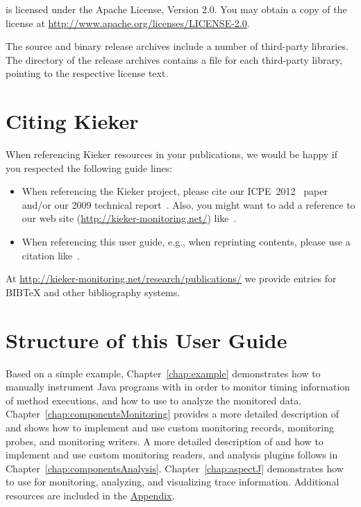 \Kieker{} is licensed under the Apache License, Version 2.0. You may obtain a copy of %
the license at \url{http://www.apache.org/licenses/LICENSE-2.0}.

The \Kieker{} source and binary release archives include a number of third-party %
libraries. %
The  directory of the release archives contains a %
 file for each third-party library, pointing to the respective license text.

\section{Citing Kieker}\label{sec:ch1:citingKieker}

When referencing Kieker resources in your publications, we would be happy if you %
respected the following guide lines:

\begin{itemize}
\item When referencing the Kieker project, please cite our %
ICPE~2012~\cite{KiekerICPE2012} paper and/or our 2009 technical report~\cite{vanHoornRohrHasselbringWallerEhlersFreyKieselhorst2009TRContinuousMonitoringOfSoftwareServicesDesignAndApplicationOfTheKiekerFramework}. %
Also, you might want to add a reference to our web site (\url{http://kieker-monitoring.net/}) %
like~\cite{KiekerWebSite}. 
\item When referencing this user guide, e.g., when reprinting contents, please %
use a citation like~\cite{Kieker1.7UserGuide}.
\end{itemize}

\noindent At \url{http://kieker-monitoring.net/research/publications/} we provide %
entries for $\mathrm{B\scriptstyle IB}\!$\TeX{} and other bibliography %
systems.

\section{Structure of this User Guide}

Based on a simple example, Chapter~\ref{chap:example} demonstrates %
how to manually instrument Java programs with \KiekerMonitoringPart{} %
in order to monitor timing information of method executions, and %
how to use \KiekerAnalysisPart{} to analyze the monitored data. %
Chapter~\ref{chap:componentsMonitoring} provides a more detailed %
description of \KiekerMonitoringPart{} and shows how to implement and %
use custom monitoring records, monitoring probes, and monitoring writers. %
A more detailed description of \KiekerAnalysisPart{} and how to implement and use %
custom monitoring readers, and analysis plugins follows in %
Chapter~\ref{chap:componentsAnalysis}. %
Chapter~\ref{chap:aspectJ} demonstrates how to use \KiekerTraceAnalysis{} %
for monitoring, analyzing, and visualizing trace information. %
Additional resources are included in the \hyperlink{hypertarget:appendix}{Appendix}.

